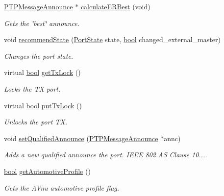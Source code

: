 \begin{DoxyCompactItemize}
\hyperlink{class_p_t_p_message_announce}{P\+T\+P\+Message\+Announce} $\ast$ \hyperlink{class_common_port_a6951410ed8e6a5ef44a028ef0a50cdeb}{calculate\+E\+R\+Best} (void)
\begin{DoxyCompactList}\small\item\em Gets the \char`\"{}best\char`\"{} announce. \end{DoxyCompactList}\item 
void \hyperlink{class_common_port_aa7588da5b66a33afeeda586e6abd334a}{recommend\+State} (\hyperlink{ptptypes_8hpp_a679431f1afc75d7bb9e972c022e53672}{Port\+State} state, \hyperlink{avb__gptp_8h_af6a258d8f3ee5206d682d799316314b1}{bool} changed\+\_\+external\+\_\+master)
\begin{DoxyCompactList}\small\item\em Changes the port state. \end{DoxyCompactList}\item 
virtual \hyperlink{avb__gptp_8h_af6a258d8f3ee5206d682d799316314b1}{bool} \hyperlink{class_common_port_a23336e7542011a26a61bdbd81bffe360}{get\+Tx\+Lock} ()
\begin{DoxyCompactList}\small\item\em Locks the TX port. \end{DoxyCompactList}\item 
virtual \hyperlink{avb__gptp_8h_af6a258d8f3ee5206d682d799316314b1}{bool} \hyperlink{class_common_port_abd9f9f0cb1265dc44a7e4846b7a1dc32}{put\+Tx\+Lock} ()
\begin{DoxyCompactList}\small\item\em Unlocks the port TX. \end{DoxyCompactList}\item 
void \hyperlink{class_common_port_a6d8b30d648cbd6048a083e64bf3cd0dd}{set\+Qualified\+Announce} (\hyperlink{class_p_t_p_message_announce}{P\+T\+P\+Message\+Announce} $\ast$annc)
\begin{DoxyCompactList}\small\item\em Adds a new qualified announce the port. I\+E\+EE 802.\+AS Clause 10.... \end{DoxyCompactList}\item 
\hyperlink{avb__gptp_8h_af6a258d8f3ee5206d682d799316314b1}{bool} \hyperlink{class_common_port_ad8dc4b5a985b466538d6805970eb0176}{get\+Automotive\+Profile} ()
\begin{DoxyCompactList}\small\item\em Gets the A\+Vnu automotive profile flag. \end{DoxyCompactList}\item 

\end{DoxyCompactItemize}
